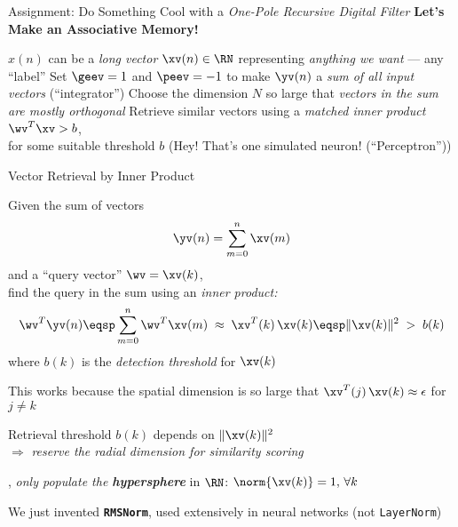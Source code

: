 \begin{slide}[\slideopts,toc={One Pole Filter}]{Assignment: Do Something Cool with a \emph{One-Pole Recursive Digital Filter}}
\vspace{-1em}
\maybepause
\vspace{-1em}
\textbf{Let's Make an Associative Memory!}
\begin{itemize}
\mpitem $x(n)$ can be a \emph{long vector} $\xv(n)\in\RN$ representing \emph{anything we want} --- any ``label''
\mpitem Set $\geev = 1$ and $\peev = -1$ to make $\yv(n)$ a \emph{sum of all input vectors} (``integrator'')
\mpitem Choose the dimension $N$ so large that \emph{vectors in the sum are mostly orthogonal}
\mpitem Retrieve similar vectors using a \emph{matched inner product} $\wv^T\xv > b$,\\
        for some suitable threshold $b$ (Hey! That's one simulated neuron! (``Perceptron''))
\end{itemize}
\end{slide}

\begin{slide}[\slideopts,toc={Inner Product}]{Vector Retrieval by Inner Product}

  Given the sum of vectors
  \[
  \yv(n) = \sum_{m=0}^n \xv(m)
  \]
  and a ``query vector'' $\wv = \xv(k)$,\\
  \maybepause
  find the query in the sum using an \emph{inner product:}
  \[
  \wv^T\yv(n) \eqsp \sum_{m=0}^n \wv^T\xv(m) \;\approx\; \xv^T(k)\,\xv(k) \eqsp \|\xv(k)\|^2 \;>\; b(k)
  \]
  where $b(k)$ is the \emph{detection threshold} for $\xv(k)$

  \begin{itemize}
  \mpitem This works because the spatial dimension is so large that $\xv^T(j)\,\xv(k)\approx \epsilon$ for $j\ne k$

  \mpitem Retrieval threshold $b(k)$ depends on $\|\xv(k)\|^2$\\
  $\Rightarrow$ \emph{reserve the radial dimension for similarity scoring}

  \mpitem \Ie, \emph{only populate the \textbf{hypersphere}} in $\RN$: $\norm{\xv(k)} = 1, \, \forall k$

  \mpitem We just invented \textbf{\texttt{RMSNorm}}, used extensively in neural networks (not \texttt{LayerNorm})

  \end{itemize}

\end{slide}


